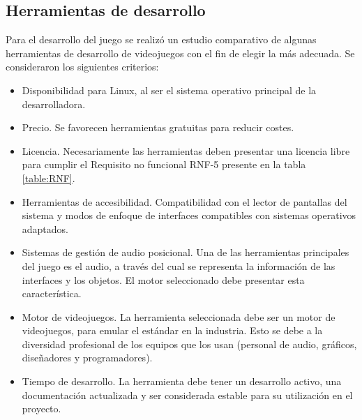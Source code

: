 \subsection{Herramientas de desarrollo}
Para el desarrollo del juego se realizó un estudio comparativo de algunas herramientas de desarrollo de videojuegos con el fin de elegir la más adecuada. Se consideraron los siguientes criterios:
\begin{itemize}
	\item Disponibilidad para Linux, al ser el sistema operativo principal de la desarrolladora.
	\item Precio. Se favorecen herramientas gratuitas para reducir costes.
	\item Licencia. Necesariamente las herramientas deben presentar una licencia libre para cumplir el Requisito no funcional RNF-5 presente en la tabla \ref{table:RNF}.
	\item Herramientas de accesibilidad. Compatibilidad con el lector de pantallas del sistema y modos de enfoque de interfaces compatibles con sistemas operativos adaptados.
	\item Sistemas de gestión de audio posicional. Una de las herramientas principales del juego es el audio, a través del cual se representa la información de las interfaces y los objetos. El motor seleccionado debe presentar esta característica.
	\item Motor de videojuegos. La herramienta seleccionada debe ser un motor de videojuegos, para emular el estándar en la industria. Esto  se debe a la diversidad profesional de los equipos que los usan (personal de audio, gráficos, diseñadores y programadores).
	\item Tiempo de desarrollo. La herramienta debe tener un desarrollo activo, una documentación actualizada y ser considerada estable para su utilización en el proyecto.
\end{itemize}

